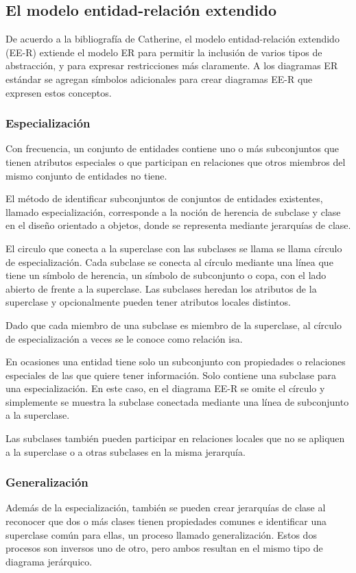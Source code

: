 \subsection{El modelo entidad-relación extendido}

De acuerdo a la bibliografía de Catherine\cite{catherine_m_ricardo_bases_nodate}, el modelo entidad-relación extendido (EE-R) extiende el modelo ER para permitir la inclusión de varios tipos de abstracción, y para expresar restricciones más claramente. A los diagramas ER estándar se agregan símbolos adicionales para crear diagramas EE-R que expresen estos conceptos.

\subsubsection{Especialización}
Con frecuencia, un conjunto de entidades contiene uno o más subconjuntos que tienen atributos especiales o que participan en relaciones que otros miembros del mismo conjunto  de entidades no tiene.


El método de identificar subconjuntos de conjuntos de entidades existentes, llamado especialización, corresponde a la noción de herencia de subclase y clase en el diseño orientado a objetos, donde se representa mediante jerarquías de clase.


El circulo que conecta a la superclase con las subclases se llama se llama círculo de especialización.  Cada subclase se conecta al círculo mediante una línea que tiene un símbolo de herencia, un símbolo de subconjunto o copa, con el lado abierto de frente a la superclase. Las subclases heredan los atributos de la superclase y opcionalmente pueden tener atributos locales distintos.


Dado que cada miembro de una subclase es miembro de la superclase, al círculo de especialización a veces se le conoce como relación isa.


En ocasiones una entidad tiene solo un subconjunto con propiedades o relaciones especiales de las que quiere tener información. Solo contiene una subclase para una especialización. En este caso, en el diagrama EE-R se omite el círculo y simplemente se muestra la subclase conectada mediante una línea de subconjunto a la superclase.


Las subclases también pueden participar en relaciones locales que no se apliquen a la superclase o a otras subclases en la misma jerarquía.

\subsubsection{Generalización}
Además de la especialización, también se pueden crear jerarquías de clase al reconocer que dos o más clases tienen propiedades comunes e identificar una superclase común para ellas, un proceso llamado generalización. Estos dos procesos son inversos uno de otro, pero ambos resultan en el mismo tipo de diagrama jerárquico.


